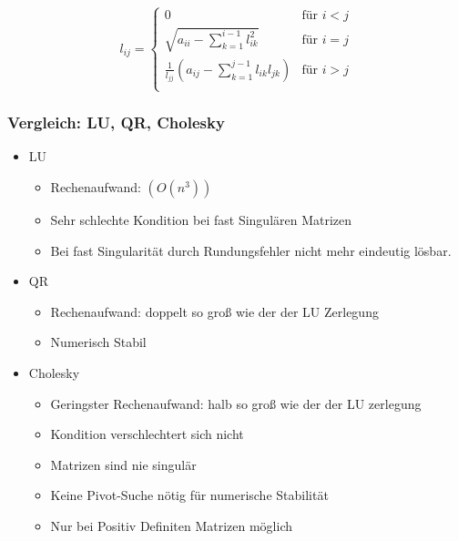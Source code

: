 \begin{displaymath}
	l_{ij} =
	\begin{cases}
		0 & \text{für } i<j \\
		\sqrt{a_{ii} - \sum_{k=1}^{i-1}l_{ik}^2} & \text{für } i=j \\
		\frac{1}{l_{jj}} (a_{ij} - \sum_{k=1}^{j-1}l_{ik}l_{jk}) & \text{für } i>j \\
	\end{cases}
\end{displaymath}

\subsubsection*{Vergleich: LU, QR, Cholesky}
\begin{itemize}

	\item LU
	\begin{itemize}
		\item Rechenaufwand: $(O(n^3))$
		\item Sehr schlechte Kondition bei fast Singulären Matrizen
		\item Bei fast Singularität durch Rundungsfehler nicht mehr eindeutig lösbar.
	\end{itemize}
	
	\item QR
	\begin{itemize}
		\item Rechenaufwand: doppelt so groß wie der der LU Zerlegung
		\item Numerisch Stabil 
	\end{itemize}
	
	\item Cholesky
	\begin{itemize}
		\item Geringster Rechenaufwand: halb so groß wie der der LU zerlegung 
		\item Kondition verschlechtert sich nicht
		\item Matrizen sind nie singulär
		\item Keine Pivot-Suche nötig für numerische Stabilität
		\item Nur bei Positiv Definiten Matrizen möglich
	\end{itemize}

\end{itemize}

